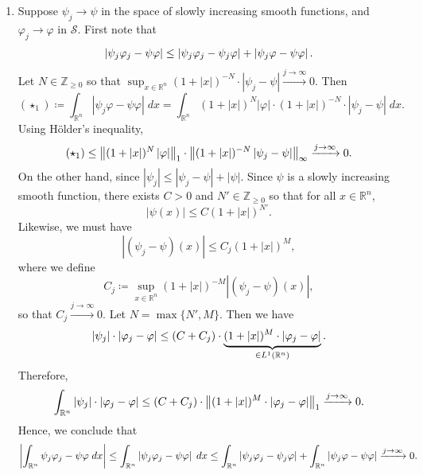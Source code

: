 \documentclass{article}
\begin{document}
\begin{itemize}
{\begin{enumerate}[itemsep =-2pt,label = (\arabic{*})]
			\item Suppose $\psi_{j} \to \psi$ in the space of slowly increasing smooth functions, and $\varphi_{j} \to \varphi$ in $\mathcal{S}$. First note that 
			\begin{equation}
				\left| \psi_{j}\varphi_{j} - \psi \varphi \right| \leq \left| \psi_{j}\varphi_{j} - \psi_{j}\varphi \right| + \left| \psi_{j}\varphi - \psi \varphi \right|. 
			\end{equation}
			Let $N \in \mathbb{Z}_{\geq 0}$ so that $\sup_{x \in \mathbb{R}^{n}}(1 + |x|)^{-N}\cdot |\psi_{j} -\psi| \xrightarrow{j \to \infty}0$. Then 
			\begin{equation}
				(\star_{1}) \coloneqq \int_{\mathbb{R}^{n}}|\psi_{j} \varphi - \psi \varphi|\;dx = \int_{\mathbb{R}^{n}}(1 + |x|)^{N}|\varphi| \cdot (1 + |x|)^{-N}\cdot |\psi_{j} - \psi|\;dx. 
			\end{equation}
			Using H\"older's inequality, 
			\begin{equation}
				(\star_{1}) \leq \left\Vert (1 + |x|)^{N}\left| \varphi \right| \right\Vert_{1} \cdot \left\Vert (1 + |x|)^{-N}\left| \psi_{j} -\psi \right| \right\Vert_{\infty} \xrightarrow{j \to\infty} 0. 
			\end{equation}
			On the other hand, since $|\psi_{j}| \leq |\psi_{j} - \psi| + |\psi|$. Since $\psi$ is a slowly increasing smooth function, there exists $C > 0$ and $N' \in \mathbb{Z}_{\geq 0}$ so that for all $x \in \mathbb{R}^{n}$, 
			\begin{equation}
				|\psi(x)| \leq C(1 + |x|)^{N'}. 
			\end{equation}
			Likewise, we must have 
			\begin{equation}
				|(\psi_{j} - \psi)(x)| \leq C_{j}(1 + |x|)^{M}, 
			\end{equation}
			where we define 
			\begin{equation}
				C_{j} \coloneqq \sup_{x \in \mathbb{R}^{n}}(1 + |x|)^{-M}|(\psi_{j} - \psi)(x)|, 
			\end{equation}
			so that $C_{j} \xrightarrow{j \to \infty}0$. Let $N = \max\{N', M\}$. Then we have 
			\begin{equation}
				\left| \psi_{j} \right| \cdot \left| \varphi_{j} - \varphi \right| \leq (C + C_{j}) \cdot \underbrace{(1 + |x|)^{M} \cdot |\varphi_{j} - \varphi|}_{\in L^{1}(\mathbb{R}^{n})}. 
			\end{equation}
			Therefore, 
			\begin{equation}
				\int_{\mathbb{R}^{n}}|\psi_{j}| \cdot |\varphi_{j} - \varphi| \leq (C + C_{j}) \cdot \left\Vert (1 + |x|)^{M} \cdot |\varphi_{j} - \varphi| \right\Vert_{1} \xrightarrow{j \to \infty} 0. 
			\end{equation}
			Hence, we conclude that 
			\begin{equation}
				\left| \int_{\mathbb{R}^{n}}\psi_{j}\varphi_{j} - \psi\varphi\;dx \right| \leq \int_{\mathbb{R}^{n}}\left| \psi_{j}\varphi_{j} - \psi \varphi \right|\;dx \leq \int_{\mathbb{R}^{n}}|\psi_{j} \varphi_{j} - \psi_{j}\varphi| + \int_{\mathbb{R}^{n}}|\psi_{j}\varphi - \psi\varphi| \xrightarrow{j \to \infty} 0. 
			\end{equation}
		\end{enumerate}	
	}
		

\end{itemize}
\end{document}
